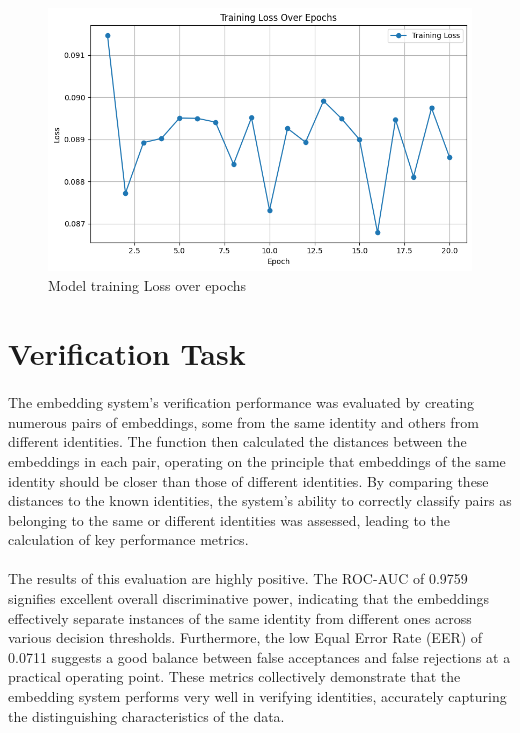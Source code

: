 \documentclass{CUP-JNL-DTM}
\theoremstyle{definition}
\numberwithin{equation}{section}
\begin{document}
\begin{figure}[ht]
    \centering
    \includegraphics[width=0.5\linewidth]{loss.png}
    \caption{Model training Loss over epochs}
    \label{fig:enter-label}
\end{figure}


\newpage

\section{Verification Task}

\paragraph{}The embedding system's verification performance was evaluated by creating numerous pairs of embeddings, some from the same identity and others from different identities. The function then calculated the distances between the embeddings in each pair, operating on the principle that embeddings of the same identity should be closer than those of different identities. By comparing these distances to the known identities, the system's ability to correctly classify pairs as belonging to the same or different identities was assessed, leading to the calculation of key performance metrics.

\paragraph{}The results of this evaluation are highly positive. The ROC-AUC of 0.9759 signifies excellent overall discriminative power, indicating that the embeddings effectively separate instances of the same identity from different ones across various decision thresholds. Furthermore, the low Equal Error Rate (EER) of 0.0711 suggests a good balance between false acceptances and false rejections at a practical operating point. These metrics collectively demonstrate that the embedding system performs very well in verifying identities, accurately capturing the distinguishing characteristics of the data.
\end{document}
